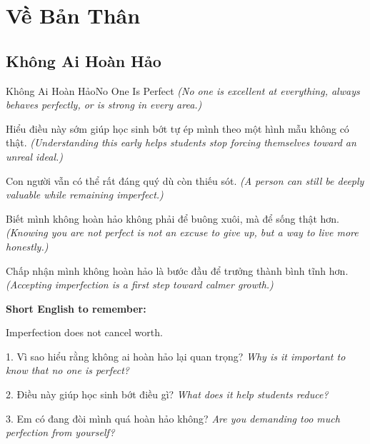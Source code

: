 \chapter{Về Bản Thân}

\section{Không Ai Hoàn Hảo}
\begin{truyen}{Không Ai Hoàn Hảo}{No One Is Perfect}
\textit{(No one is excellent at everything, always behaves perfectly, or is strong in every area.)}

Hiểu điều này sớm giúp học sinh bớt tự ép mình theo một hình mẫu không có thật.
\textit{(Understanding this early helps students stop forcing themselves toward an unreal ideal.)}

Con người vẫn có thể rất đáng quý dù còn thiếu sót.
\textit{(A person can still be deeply valuable while remaining imperfect.)}

Biết mình không hoàn hảo không phải để buông xuôi, mà để sống thật hơn.
\textit{(Knowing you are not perfect is not an excuse to give up, but a way to live more honestly.)}
\end{truyen}

\begin{baihoc}
Chấp nhận mình không hoàn hảo là bước đầu để trưởng thành bình tĩnh hơn.
\textit{(Accepting imperfection is a first step toward calmer growth.)}
\end{baihoc}

\begin{ghinhoanh}
\textbf{Short English to remember:}

Imperfection does not cancel worth.

\end{ghinhoanh}

\begin{tuhocnhanh}
1. Vì sao hiểu rằng không ai hoàn hảo lại quan trọng? \textit{Why is it important to know that no one is perfect?}

2. Điều này giúp học sinh bớt điều gì? \textit{What does it help students reduce?}

3. Em có đang đòi mình quá hoàn hảo không? \textit{Are you demanding too much perfection from yourself?}
\end{tuhocnhanh}
\ngancach

